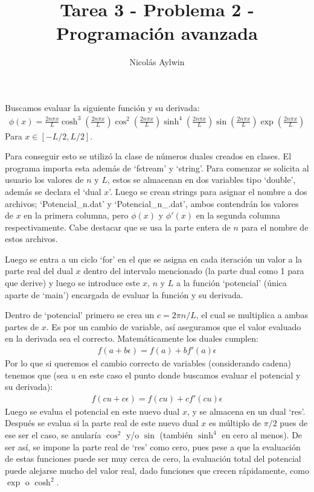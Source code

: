 \documentclass[12pt]{article}
\title{Tarea 3 - Problema 2 - Programación avanzada}
\author{Nicolás Aylwin}
\date{}
\begin{document}
\maketitle
Buscamos evaluar la siguiente función y su derivada:
\begin{align*}
\phi(x)=\frac{2n\pi x}{L}\cosh^3\left(\frac{2n\pi x}{L}\right)\cos^2\left(\frac{2n\pi x}{L}\right)\sinh^4\left(\frac{2n\pi x}{L}\right)\sin\left(\frac{2n\pi x}{L}\right)\exp\left(\frac{2n\pi x}{L}\right)
\end{align*}
Para $x \in [-L/2,L/2]$.

Para conseguir esto se utilizó la clase de números duales creados en clases. El programa importa esta además de `fstream' y `string'. Para comenzar se solicita al usuario los valores de $n$ y $L$, estos se almacenan en dos variables tipo `double', además se declara el `dual $x$'. Luego se crean strings para asignar el nombre a dos archivos; `Potencial\_n.dat' y `Potencial\_n\_.dat', ambos contendrán los valores de $x$ en la primera columna, pero $\phi(x)$ y $\phi '(x)$ en la segunda columna respectivamente. Cabe destacar que se usa la parte entera de $n$ para el nombre de estos archivos. 

Luego se entra a un ciclo `for' en el que se asigna en cada iteración un valor a la parte real del dual $x$ dentro del intervalo mencionado (la parte dual como 1 para que derive) y luego se introduce este $x$, $n$ y $L$ a la función `potencial' (única aparte de `main') encargada de evaluar la función y su derivada.

Dentro de `potencial' primero se crea un $c=2\pi n /L$, el cual se multiplica a ambas partes de $x$. Es por un cambio de variable, así aseguramos que el valor evaluado en la derivada sea el correcto. Matemáticamente los duales cumplen:
\begin{align*}
f(a+b\epsilon)=f(a)+bf'(a)\epsilon
\end{align*}
Por lo que si queremos el cambio correcto de variables (considerando cadena) tenemos que (sea $u$ en este caso el punto donde buscamos evaluar el potencial y su derivada):
\begin{align*}
f(cu+c\epsilon)=f(cu)+cf'(cu)\epsilon
\end{align*}
Luego se evalua el potencial en este nuevo dual $x$, y se almacena en un dual `res'. Después se evalua si la parte real de este nuevo dual $x$ es múltiplo de $\pi/2$ pues de ese ser el caso, se anularía $\cos^2$ y/o $\sin$ (también $\sinh^4$ en cero al menos). De ser así, se impone la parte real de `res' como cero, pues pese a que la evaluación de estas funciones puede ser muy cerca de cero, la evaluación total del potencial puede alejarse mucho del valor real, dado funciones que crecen rápidamente, como $\exp$ o $\cosh^2$.
\end{document}
